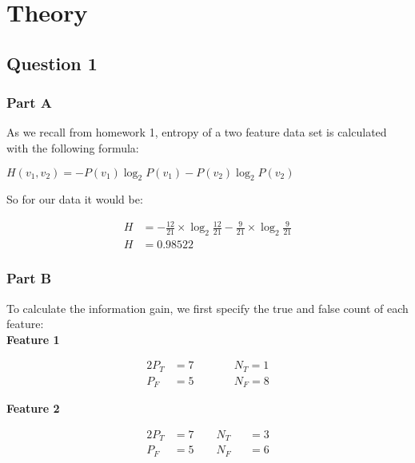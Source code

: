 \documentclass[12pt]{article}
\begin{document}
\maketitle

\newpage
\section{Theory}
\subsection{Question 1}
\subsubsection{Part A}

\noindent
As we recall from homework 1, entropy of a two feature data set is calculated with the following formula:
\begin{center}
    $
    H(v_1, v_2) = -P(v_1)\log_{2}{P(v_1)} - P(v_2)\log_{2}{P(v_2)}
    $
\end{center}

\noindent
So for our data it would be:

\begin{center}
    \begin{align*}
        H &= - \frac{12}{21} \times \log_{2}{\frac{12}{21}} - \frac{9}{21} \times \log_{2}{\frac{9}{21}} \\
        H &= 0.98522
    \end{align*}
\end{center}

\subsubsection{Part B}

\noindent
To calculate the information gain, we first specify the true and false count of each feature:
\noindent
\\[0.1 in]
\textbf{Feature 1}
\begin{center}
    \begin{alignat*}{2}
        P_{T} &= 7 \qquad &&N_{T} = 1 \\
        P_{F} &= 5 \qquad &&N_{F} = 8
    \end{alignat*}
\end{center}

\noindent
\textbf{Feature 2}
\begin{center}
    \begin{alignat*}{2}
        P_{T} &= 7 \qquad N_{T} &&= 3 \\
        P_{F} &= 5 \qquad N_{F} &&= 6
    \end{alignat*}
\end{center}
\end{document}
